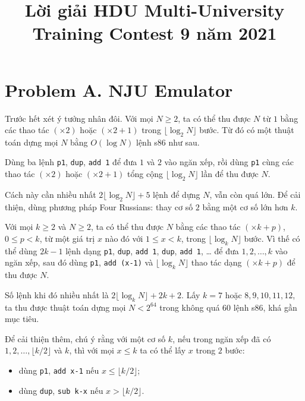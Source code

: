 \documentclass[11pt]{article}
\title{Lời giải HDU Multi-University Training Contest 9 năm 2021}
\author{}
\date{}
\begin{document}
\maketitle


\section{Problem A. NJU Emulator}

Trước hết xét ý tưởng nhân đôi. Với mọi $N\ge 2$, ta có thể thu được $N$ từ
$1$ bằng các thao tác $(\times 2)$ hoặc $(\times 2+1)$ trong
$\lfloor\log_2 N\rfloor$ bước. Từ đó có một thuật toán dựng mọi $N$ bằng
$O(\log N)$ lệnh s86 như sau.

Dùng ba lệnh \texttt{p1}, \texttt{dup}, \texttt{add 1} để đưa $1$ và $2$ vào
ngăn xếp, rồi dùng \texttt{p1} cùng các thao tác $(\times 2)$ hoặc
$(\times 2+1)$ tổng cộng $\lfloor\log_2 N\rfloor$ lần để thu được $N$.

Cách này cần nhiều nhất $2\lfloor\log_2 N\rfloor+5$ lệnh để dựng $N$, vẫn còn
quá lớn. Để cải thiện, dùng phương pháp Four Russians: thay cơ số $2$ bằng
một cơ số lớn hơn $k$.

Với mọi $k\ge 2$ và $N\ge 2$, ta có thể thu được $N$ bằng các thao tác
$(\times k+p)$, $0\le p<k$, từ một giá trị $x$ nào đó với $1\le x<k$, trong
$\lfloor\log_k N\rfloor$ bước. Vì thế có thể dùng $2k-1$ lệnh dạng
\texttt{p1}, \texttt{dup}, \texttt{add 1}, \texttt{dup}, \texttt{add 1},
\ldots{} để đưa $1,2,\ldots,k$ vào ngăn xếp, sau đó dùng \texttt{p1},
\texttt{add (x-1)} và $\lfloor\log_k N\rfloor$ thao tác dạng
$(\times k+p)$ để thu được $N$.

Số lệnh khi đó nhiều nhất là $2\lfloor\log_k N\rfloor+2k+2$. Lấy
$k=7$ hoặc $8,9,10,11,12$, ta thu được thuật toán dựng mọi $N<2^{64}$ trong
không quá $60$ lệnh s86, khá gần mục tiêu.

Để cải thiện thêm, chú ý rằng với một cơ số $k$, nếu trong ngăn xếp đã có
$1,2,\ldots,\lfloor k/2\rfloor$ và $k$, thì với mọi $x\le k$ ta có thể lấy
$x$ trong $2$ bước:
\begin{itemize}
  \item dùng \texttt{p1}, \texttt{add x-1} nếu
  $x\le\lfloor k/2\rfloor$;
  \item dùng \texttt{dup}, \texttt{sub k-x} nếu
  $x>\lfloor k/2\rfloor$.
\end{itemize}
\end{document}

